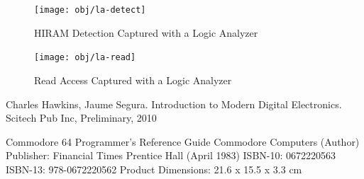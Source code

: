 \documentclass[a4paper,oneside]{memoir}
\begin{document}
\begin{figure}
    \centering
    \texttt{[image: obj/la-detect]}
    \caption{HIRAM Detection Captured with a Logic Analyzer}
    \label{fig:la-detect}
\end{figure}

\begin{figure}
    \centering
    \texttt{[image: obj/la-read]}
    \caption{Read Access Captured with a Logic Analyzer}
    \label{fig:la-read}
\end{figure}



\cite[Ch.~3]{HS10}

\begin{thebibliography}{999}
 Charles Hawkins, Jaume Segura. Introduction to Modern
Digital Electronics. Scitech Pub Inc, Preliminary, 2010
\end{thebibliography}


Commodore 64 Programmer's Reference Guide
Commodore Computers (Author)
Publisher: Financial Times Prentice Hall (April 1983)
ISBN-10: 0672220563
ISBN-13: 978-0672220562
 Product Dimensions:  21.6 x 15.5 x 3.3 cm
\end{document}
